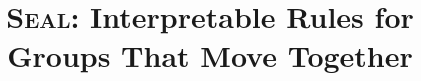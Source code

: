 \documentclass[11pt]{article}
\title{\textsc{Seal}: Interpretable Rules for Groups That Move Together}
\author{}
\date{}
\begin{document}
\maketitle

\begin{abstract}

\end{abstract}











\end{document}
